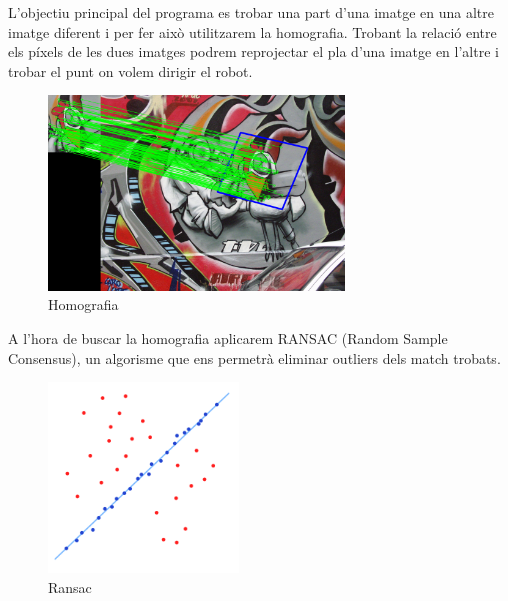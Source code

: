 	L'objectiu principal del programa es trobar una part d'una imatge en una altre imatge diferent i per fer això utilitzarem la homografia. Trobant la relació entre els píxels de les dues imatges podrem
	reprojectar el pla d'una imatge en l'altre i trobar el punt on volem dirigir el robot.\\
	\begin{figure}[H]
		\centering
		\includegraphics[width=0.7\textwidth]{images/homography}
		\caption{Homografia}
	\end{figure}
	\noindent
	A l'hora de buscar la homografia aplicarem RANSAC (Random Sample Consensus), un algorisme que ens permetrà eliminar outliers dels match trobats.\\
	\begin{figure}[H]
		\centering
		\includegraphics[width=0.45\textwidth]{images/ransac}
		\caption{Ransac}
	\end{figure}
